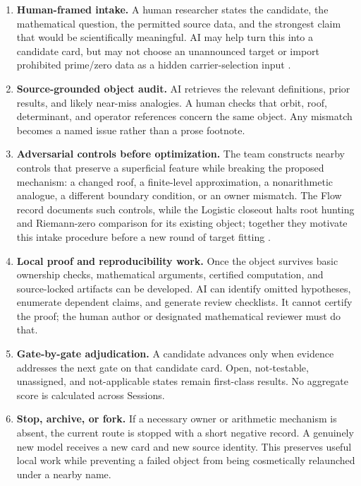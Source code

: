 \begin{enumerate}
\def\labelenumi{\arabic{enumi}.}
\item
  \textbf{Human-framed intake.} A human researcher states the candidate, the mathematical question, the permitted source data, and the strongest claim that would be scientifically meaningful. AI may help turn this into a candidate card, but may not choose an unannounced target or import prohibited prime/zero data as a hidden carrier-selection input .
\item
  \textbf{Source-grounded object audit.} AI retrieves the relevant definitions, prior results, and likely near-miss analogies. A human checks that orbit, roof, determinant, and operator references concern the same object. Any mismatch becomes a named issue rather than a prose footnote.
\item
  \textbf{Adversarial controls before optimization.} The team constructs nearby controls that preserve a superficial feature while breaking the proposed mechanism: a changed roof, a finite-level approximation, a nonarithmetic analogue, a different boundary condition, or an owner mismatch. The Flow record documents such controls, while the Logistic closeout halts root hunting and Riemann-zero comparison for its existing object; together they motivate this intake procedure before a new round of target fitting  .
\item
  \textbf{Local proof and reproducibility work.} Once the object survives basic ownership checks, mathematical arguments, certified computation, and source-locked artifacts can be developed. AI can identify omitted hypotheses, enumerate dependent claims, and generate review checklists. It cannot certify the proof; the human author or designated mathematical reviewer must do that.
\item
  \textbf{Gate-by-gate adjudication.} A candidate advances only when evidence addresses the next gate on that candidate card. Open, not-testable, unassigned, and not-applicable states remain first-class results. No aggregate score is calculated across Sessions.
\item
  \textbf{Stop, archive, or fork.} If a necessary owner or arithmetic mechanism is absent, the current route is stopped with a short negative record. A genuinely new model receives a new card and new source identity. This preserves useful local work while preventing a failed object from being cosmetically relaunched under a nearby name.
\end{enumerate}

